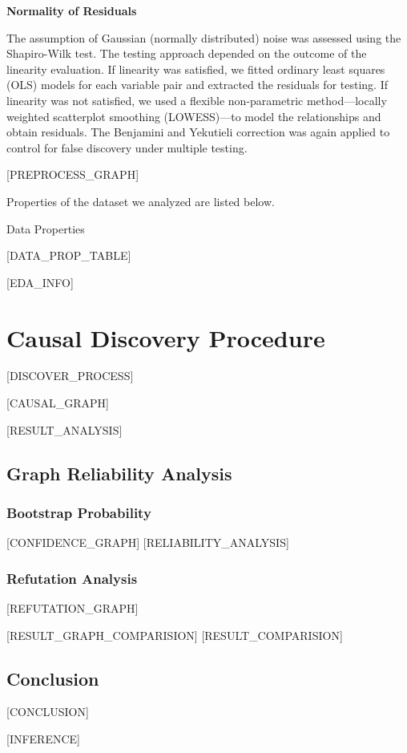 \documentclass{article}
\begin{document}
\textbf{Normality of Residuals}

The assumption of Gaussian (normally distributed) noise was assessed using the Shapiro-Wilk test. 
The testing approach depended on the outcome of the linearity evaluation. 
If linearity was satisfied, we fitted ordinary least squares (OLS) models for each variable pair and extracted the residuals for testing. 
If linearity was not satisfied, we used a flexible non-parametric method—locally weighted scatterplot smoothing (LOWESS)—to model the relationships and obtain residuals. 
The Benjamini and Yekutieli correction was again applied to control for false discovery under multiple testing.



[PREPROCESS_GRAPH]


Properties of the dataset we analyzed are listed below.

\begin{table}[H]
    \centering
    \caption{Data Properties}
[DATA_PROP_TABLE]
\end{table}

[EDA_INFO]

\section{Causal Discovery Procedure}
[DISCOVER_PROCESS]

[CAUSAL_GRAPH]

[RESULT_ANALYSIS]

\subsection{Graph Reliability Analysis}

\subsubsection{Bootstrap Probability}
[CONFIDENCE_GRAPH]
[RELIABILITY_ANALYSIS]

\subsubsection{Refutation Analysis}
[REFUTATION_GRAPH]

[RESULT_GRAPH_COMPARISION]
[RESULT_COMPARISION]

\subsection{Conclusion}
[CONCLUSION]

[INFERENCE]
\end{document}
